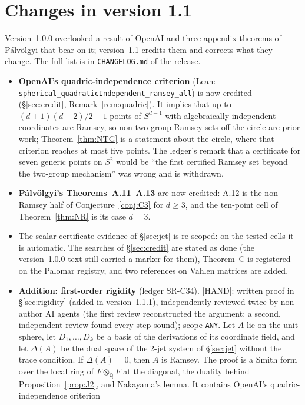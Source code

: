 \documentclass[11pt]{amsart}
\newcommand{\st}[1]{\textsf{[#1]}}
\newcommand{\Q}{\mathbb{Q}}
\theoremstyle{plain}
\theoremstyle{definition}
\begin{document}
\section*{Changes in version 1.1}

Version~1.0.0 overlooked a result of OpenAI and three appendix theorems of P\'alv\"olgyi that bear on
it; version~1.1 credits them and corrects what they change. The full list is in \texttt{CHANGELOG.md}
of the release.
\begin{itemize}
\item \textbf{OpenAI's quadric-independence criterion} \cite[Prop.~7.3]{OAI172} (Lean:
\texttt{spherical\_\allowbreak{}quadraticIndependent\_\allowbreak{}ramsey\_\allowbreak{}all}) is now credited
(\S\ref{sec:credit}, Remark~\ref{rem:quadric}). It implies that up to $(d+1)(d+2)/2-1$ points of
$S^{d-1}$ with algebraically independent coordinates are Ramsey, so non-two-group Ramsey sets off the
circle are prior work; Theorem~\ref{thm:NTG} is a statement about the circle, where that criterion
reaches at most five points. The ledger's remark that a certificate for seven generic points on $S^2$
would be ``the first certified Ramsey set beyond the two-group mechanism'' was wrong and is withdrawn.
\item \textbf{P\'alv\"olgyi's Theorems~A.11--A.13} \cite{Palvolgyi} are now credited: A.12 is the
non-Ramsey half of Conjecture~\ref{conj:C3} for $d\ge3$, and the ten-point cell of
Theorem~\ref{thm:NR} is its case $d=3$.
\item The scalar-certificate evidence of \S\ref{sec:jet} is re-scoped: on the tested cells it is
automatic. The searches of \S\ref{sec:credit} are stated as done (the version~1.0.0 text still carried
a marker for them), Theorem~C is registered on the Palomar registry, and two references on Vahlen
matrices are added.
\item \textbf{Addition: first-order rigidity} (ledger SR-C34). \st{HAND}: written proof in \S\ref{sec:rigidity} (added in
version~1.1.1), independently reviewed twice by non-author AI agents (the first review reconstructed the
argument; a second, independent review found every step sound); scope
\texttt{ANY}. Let $A$ lie on the unit sphere, let $D_1,\dots,D_k$ be a basis of the
derivations of its coordinate field, and let $\Delta(A)$ be the dual space of the 2-jet system of
\S\ref{sec:jet} without the trace condition. If $\Delta(A)=0$, then $A$ is Ramsey. The proof is a Smith
form over the local ring of $F\otimes_\Q F$ at the diagonal, the duality behind
Proposition~\ref{prop:J2}, and Nakayama's lemma. It contains OpenAI's quadric-independence criterion

\end{itemize}
\end{document}
